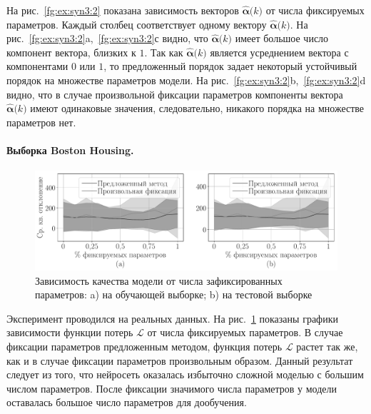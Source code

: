 На рис.~\ref{fg:ex:syn3:2} показана зависимость векторов $\hat{\bm{\alpha}}\bigr(k\bigr)$ от числа фиксируемых параметров. Каждый столбец соответствует одному вектору $\hat{\bm{\alpha}}\bigr(k\bigr)$. На рис.~\ref{fg:ex:syn3:2}a,~\ref{fg:ex:syn3:2}с видно, что $\hat{\bm{\alpha}}\bigr(k\bigr)$ имеет большое число компонент вектора, близких к $1$. Так как $\hat{\bm{\alpha}}\bigr(k\bigr)$ является усреднением вектора с компонентами $0$ или $1$, то предложенный порядок задает некоторый устойчивый порядок на множестве параметров модели. На рис.~\ref{fg:ex:syn3:2}b,~\ref{fg:ex:syn3:2}d видно, что в случае произвольной фиксации параметров компоненты вектора $\hat{\bm{\alpha}}\bigr(k\bigr)$ имеют одинаковые значения, следовательно, никакого порядка на множестве параметров нет.

\paragraph{Выборка Boston Housing.}
\begin{figure}[h!t]\center
\includegraphics[width=1\textwidth]{results/order/boston_data_loss}
\caption{Зависимость качества модели от числа зафиксированных параметров: a) на обучающей выборке; b) на тестовой выборке}
\label{fg:ex:bost:1}
\end{figure}
Эксперимент проводился на реальных данных.
На рис.~\ref{fg:ex:bost:1} показаны графики зависимости функции потерь $\mathcal{L}$ от числа фиксируемых параметров. В случае фиксации параметров предложенным методом, функция потерь $\mathcal{L}$ растет так же, как и в случае фиксации параметров произвольным образом.
Данный результат следует из того, что нейросеть оказалась избыточно сложной моделью с большим числом параметров. После фиксации значимого числа параметров у модели оставалась большое число параметров для дообучения.

